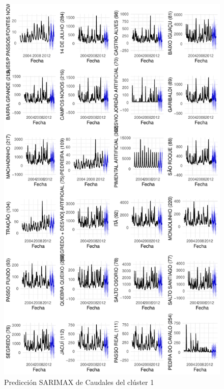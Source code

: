 \documentclass[12pt,oneside]{book}\usepackage[]{graphicx}\usepackage[]{color}
\makeatletter
\def\maxwidth{ %
  \ifdim\Gin@nat@width>\linewidth
    \linewidth
  \else
    \Gin@nat@width
  \fi
}
\newenvironment{knitrout}{}{} %
\theoremstyle{definition} %
\makeatother
\begin{document}
\begin{knitrout}
\color{fgcolor}\begin{figure}[h]

{\centering \includegraphics[width=\maxwidth,height=0.85\textheight]{figure/unnamed-chunk-100-1} 

}

\caption{\label{fig:pred_clx1} Predicción SARIMAX de Caudales del clúster 1}\label{fig:unnamed-chunk-100}
\end{figure}


\end{knitrout}
\end{document}
